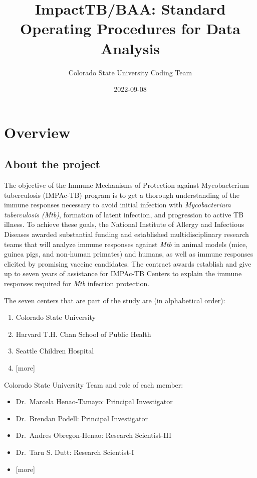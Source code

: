 \documentclass[
]{book}
\title{ImpactTB/BAA: Standard Operating Procedures for Data Analysis}
\author{Colorado State University Coding Team}
\date{2022-09-08}
\providecommand{\tightlist}{%
  \setlength{\itemsep}{0pt}\setlength{\parskip}{0pt}}
\begin{document}
\maketitle

{
\setcounter{tocdepth}{1}
\tableofcontents
}
\hypertarget{overview}{%
\chapter{Overview}\label{overview}}

\hypertarget{about-the-project}{%
\section{About the project}\label{about-the-project}}

The objective of the Immune Mechanisms of Protection against Mycobacterium tuberculosis (IMPAc-TB) program is to get a thorough understanding of the immune responses necessary to avoid initial infection with \emph{Mycobacterium tuberculosis (Mtb)}, formation of latent infection, and progression to active TB illness. To achieve these goals, the National Institute of Allergy and Infectious Diseases awarded substantial funding and established multidisciplinary research teams that will analyze immune responses against \emph{Mtb} in animal models (mice, guinea pigs, and non-human primates) and humans, as well as immune responses elicited by promising vaccine candidates. The contract awards establish and give up to seven years of assistance for IMPAc-TB Centers to explain the immune responses required for \emph{Mtb} infection protection.

The seven centers that are part of the study are (in alphabetical order):

\begin{enumerate}
\def\labelenumi{\arabic{enumi}.}
\tightlist
\item
  Colorado State University
\item
  Harvard T.H. Chan School of Public Health
\item
  Seattle Children Hospital
\item
  {[}more{]}
\end{enumerate}

Colorado State University Team and role of each member:

\begin{itemize}
\tightlist
\item
  Dr.~Marcela Henao-Tamayo: Principal Investigator
\item
  Dr.~Brendan Podell: Principal Investigator
\item
  Dr.~Andres Obregon-Henao: Research Scientist-III
\item
  Dr.~Taru S. Dutt: Research Scientist-I
\item
  {[}more{]}
\end{itemize}
\end{document}
